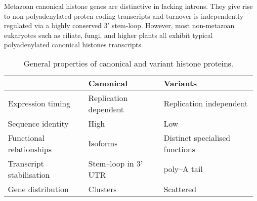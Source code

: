   Metazoan canonical histone genes are distinctive in lacking introns. 
  They give rise to non-polyadenylated proten coding transcripts and 
  turnover is independently regulated via a highly conserved 3' stem-loop. 
  However, most non-metazoan eukaryotes such as ciliate, fungi, and higher plants 
  all exhibit typical polyadenylated canonical histones transcripts.



  \begin{table*}
    \caption{General properties of canonical and variant histone proteins.}
    \label{tab:typical-histone-differences}
    \centering
    \begin{tabular}{l l l}
      \toprule
      \null                     & Canonical             & Variants \\
      \midrule
      Expression timing         & Replication dependent & Replication independent \\
      Sequence identity         & High                  & Low \\
      Functional relationships  & Isoforms              & Distinct specialised functions \\
      Transcript stabilisation  & Stem--loop in 3' UTR  & poly--A tail \\
      Gene distribution         & Clusters              & Scattered \\
      \bottomrule
    \end{tabular}
  \end{table*}


